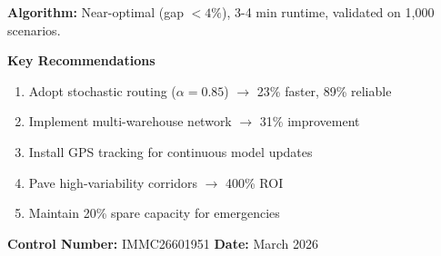 \noindent \textbf{Algorithm:} Near-optimal (gap $< 4\%$), 3-4 min runtime, validated on 1,000 scenarios.

\vspace{0.4cm}

\textbf{\Large Key Recommendations}

\begin{enumerate}
\item Adopt stochastic routing ($\alpha = 0.85$) $\to$ 23\% faster, 89\% reliable
\item Implement multi-warehouse network $\to$ 31\% improvement
\item Install GPS tracking for continuous model updates
\item Pave high-variability corridors $\to$ 400\% ROI
\item Maintain 20\% spare capacity for emergencies
\end{enumerate}

\vspace{0.4cm}

\noindent \textbf{\large Control Number:} IMMC26601951 \hfill \textbf{\large Date:} March 2026
